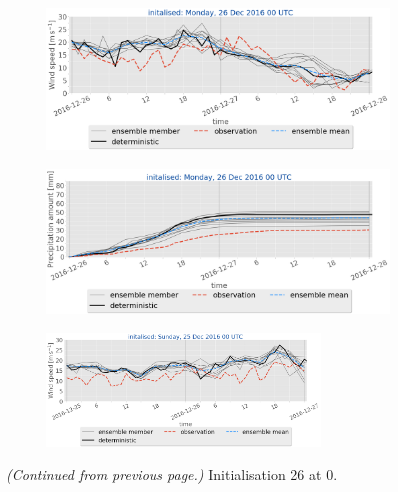 \begin{figure}[H]
	\begin{subfigure}[b]{0.49\textwidth}
		\includegraphics[trim={0.cm 5.cm 0cm 0cm},clip,
		width=\textwidth]{./fig_sfc_ws/20161226_00}
		\caption{}\label{fig:res:sfc_ws26}
	\end{subfigure}
	
	\begin{subfigure}[b]{0.49\textwidth}
		\includegraphics[trim={0.cm 3.6cm 0cm 0cm},clip,
		width=\textwidth]{./fig_sfc_precip/20161226_00}
		\caption{}\label{fig:res:sfc_precip26}
	\end{subfigure}
	
	\begin{subfigure}[b]{\textwidth}
		\centering
		\includegraphics[trim={5.5cm 0cm 5.cm 17.2cm},clip,
		width=0.8\textwidth]{./fig_sfc_ws/20161225_00}
	\end{subfigure}
    \caption{\textit{(Continued from previous page.)} Initialisation \SI{26}{\dec} at \SI{0}{\UTC}.}
\end{figure}
